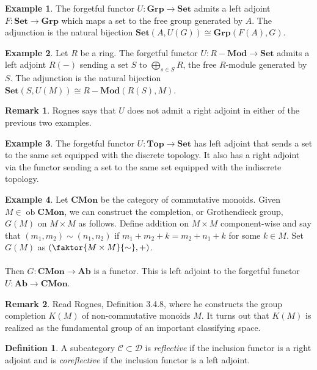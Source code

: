 \documentclass[10pt,letterpaper,cm]{nupset}
\theoremstyle{definition}
\newtheorem*{definition}{Definition}
\newtheorem{exmp}{Example}
\newtheorem{remark}{Remark}
\newcommand{\1}{\mathbf{1}}
\renewcommand{\c}{\mathscr{C}}
\renewcommand{\d}{\mathscr{D}}
\newcommand{\0}{\vec 0}
\DeclareMathOperator{\ob}{ob}
\begin{document}
\begin{exmp}
The forgetful functor $U: \mathbf{Grp} \to \mathbf{Set}$ admits a left adjoint $F: \mathbf{Set} \to \mathbf{Grp}$ which maps a set to the free group generated by $A$. The adjunction is the natural bijection $\mathbf{Set}(A, U(G)) \cong \mathbf{Grp}(F(A), G)$.
\end{exmp}

\begin{exmp}
Let $R$ be a ring. The forgetful functor $U: R-\mathbf{Mod}\to \mathbf{Set}$ admits a left adjoint $R(-)$ sending a set $S$ to $\bigoplus_{s\in S} R$, the free $R$-module generated by $S$. The adjunction is the natural bijection $\mathbf{Set}(S, U(M)) \cong R-\mathbf{Mod}(R(S), M)$.
\end{exmp}

\begin{remark}
Rognes says that $U$ does not admit a right adjoint in either of the previous two examples.
\end{remark}

\begin{exmp}
The forgetful functor $U: \mathbf{Top} \to \mathbf{Set}$ has left adjoint that sends a set to the same set equipped with the discrete topology.  It also has a right adjoint via the functor sending a set to the same set equipped with the indiscrete topology.
\end{exmp}

\begin{exmp}
Let $\mathbf{CMon}$ be the category of commutative monoids. Given $M\in \ob \mathbf{CMon}$, we can construct the completion, or Grothendieck group, $G(M)$ on $M\times M$ as follows. Define addition on $M \times M$ component-wise and say that $(m_1, m_2) \sim (n_1, n_2)$ if $m_1 + m_2 + k = m_2 +n_1 +k$ for some $k\in M$. Set $G(M)$ as $(\faktor{M\times M}{\sim}, +)$.
\\ \\
Then $G: \mathbf{CMon} \to \mathbf{Ab}$ is a functor. This is left adjoint to the forgetful functor $U: \mathbf{Ab} \to \mathbf{CMon}$.
\end{exmp}

\begin{remark}
Read Rognes, Definition 3.4.8, where he constructs the group completion $K(M)$ of non-commutative monoids $M$. It turns out that $K(M)$ is realized as the fundamental group of an important classifying space. 
\end{remark}

\begin{definition}
A subcategory $\c \subset \d$ is \textit{reflective} if the inclusion functor is a right adjoint and is \textit{coreflective} if the inclusion functor is a left adjoint. 
\end{definition}
\end{document}
